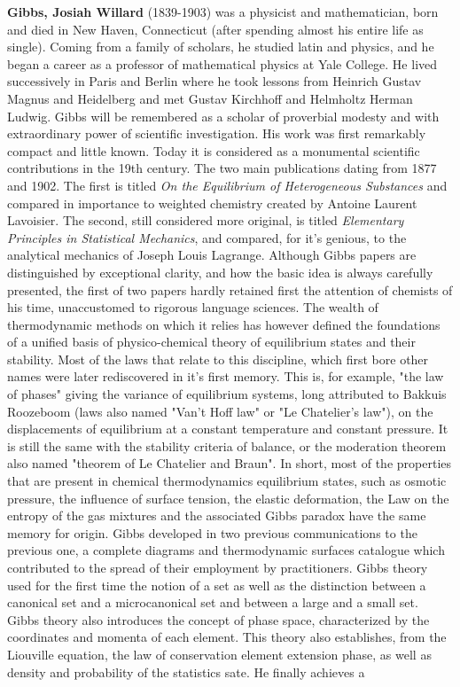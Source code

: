 \textbf{Gibbs, Josiah Willard} (1839-1903) was a physicist and mathematician, born and died in New Haven, Connecticut (after spending almost his entire life as single). Coming from a family of scholars, he studied latin and physics, and he began a career as a professor of mathematical physics at Yale College. He lived successively in Paris and Berlin where he took lessons from Heinrich Gustav Magnus and Heidelberg and met Gustav Kirchhoff and Helmholtz Herman Ludwig. Gibbs will be remembered as a scholar of proverbial modesty and with extraordinary power of scientific investigation. His work was first remarkably compact and little known. Today it is considered as a monumental scientific contributions in the 19th century. The two main publications dating from 1877 and 1902. The first is titled \textit{On the Equilibrium of Heterogeneous Substances} and compared in importance to weighted chemistry created by Antoine Laurent Lavoisier. The second, still considered more original, is titled \textit{Elementary Principles in Statistical Mechanics}, and compared, for it's genious, to the analytical mechanics of Joseph Louis Lagrange. Although Gibbs papers are distinguished by exceptional clarity, and how the basic idea is always carefully presented, the first of two papers hardly retained first the attention of chemists of his time, unaccustomed to rigorous language sciences. The wealth of thermodynamic methods on which it relies has however defined the foundations of a unified basis of physico-chemical theory of equilibrium states and their stability. Most of the laws that relate to this discipline, which first bore other names were later rediscovered in it's first memory. This is, for example, "the law of phases" giving the variance of equilibrium systems, long attributed to Bakkuis Roozeboom (laws also named "Van't Hoff law" or "Le Chatelier's law"), on the displacements of equilibrium at a constant temperature and constant pressure. It is still the same with the stability criteria of balance, or the moderation theorem also named "theorem of Le Chatelier and Braun". In short, most of the properties that are present in chemical thermodynamics equilibrium states, such as osmotic pressure, the influence of surface tension, the elastic deformation, the Law on the entropy of the gas mixtures and the associated Gibbs paradox have the same memory for origin. Gibbs developed in two previous communications to the previous one, a complete diagrams and thermodynamic surfaces catalogue which contributed to the spread of their employment by practitioners. Gibbs theory used for the first time the notion of a set as well as the distinction between a canonical set and a microcanonical set and between a large and a small set. Gibbs theory also introduces the concept of phase space, characterized by the coordinates and momenta of each element. This theory also establishes, from the Liouville equation, the law of conservation element extension phase, as well as density and probability of the statistics sate. He finally achieves a 